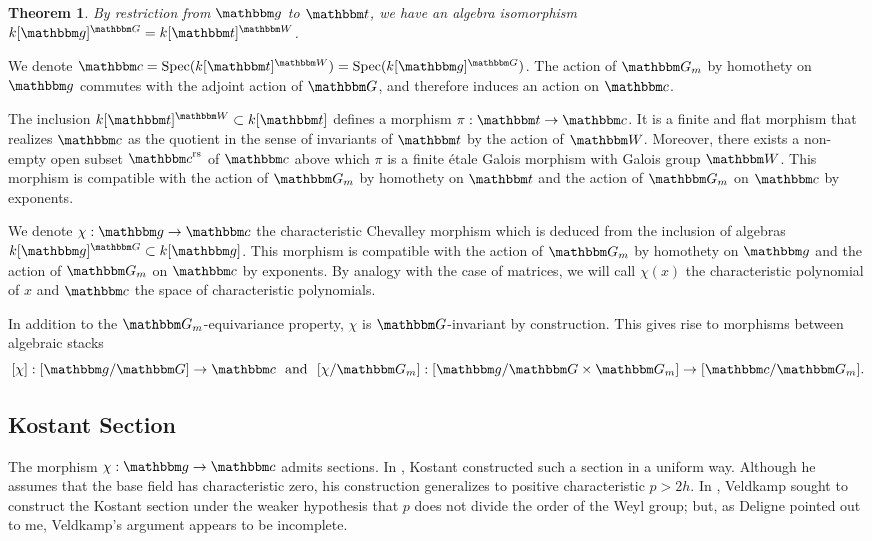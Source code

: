 \documentclass[12pt,english]{smfart}
\numberwithin{equation}{subsection}
\newtheorem{theoreme}[equation]{Theorem}
\theoremstyle{remark}
\newcommand\rta{\rightarrow}
\newcommand\GG{{\mathbbm G}}
\newcommand\bbW{{\mathbbm W}}
\newcommand\bbG{{\mathbbm G}}
\newcommand\bbg{{\mathbbm g}}
\newcommand\bbt{{\mathbbm t}}
\newcommand\bbc{{\mathbbm c}}
\newcommand\Spec{{\rm Spec}}
\newcommand\rs{{\rm rs}}
\begin{document}
\begin{theoreme}\label{Chevalley}
By restriction from $\bbg$ to $\bbt$, we have an algebra isomorphism
$k[\bbg]^\bbG =k[\bbt]^\bbW$.
\end{theoreme}


We denote $\bbc=\Spec(k[\bbt]^\bbW)=\Spec(k[\bbg]^\bbG)$. The action of $\GG_m$ by homothety on $\bbg$ commutes with the adjoint action of $\bbG$, and therefore induces an action on $\bbc$.

The inclusion $k[\bbt]^\bbW\subset k[\bbt]$ defines a morphism
$\pi:\bbt\rightarrow\bbc$. It is a finite and flat morphism that realizes
$\bbc$ as the quotient in the sense of invariants of $\bbt$ by the action of
$\bbW$. Moreover, there exists a non-empty open subset $\bbc^\rs$ of $\bbc$
above which $\pi$ is a finite \'etale Galois morphism with Galois group
$\bbW$. This morphism is compatible with the action of $\GG_m$ by
homothety on $\bbt$ and the action of $\GG_m$ on $\bbc$ by exponents.

We denote $ \chi:\bbg\rta\bbc$ the characteristic Chevalley morphism
which is deduced from the inclusion of algebras $k[\bbg]^\bbG\subset k[\bbg]$. This
morphism is compatible with the action of $\GG_m$ by homothety on
$\bbg$ and the action of $\GG_m$ on $\bbc$ by exponents. By
analogy with the case of matrices, we will call $\chi(x)$ the characteristic
polynomial of $x$ and $\bbc$ the space of characteristic
polynomials.

In addition to the $\GG_m$-equivariance property, $\chi$ is $\bbG$-invariant
by construction. This gives rise to morphisms between
algebraic stacks
$$[\chi]:[\bbg/\bbG]\rta \bbc\ \mbox{ and }\ [\chi/\GG_m]:
[\bbg/\bbG\times\GG_m]\rta [\bbc/\GG_m].$$


\subsection{Kostant Section}\label{Section de Kostant}

The morphism $\chi:\bbg\rightarrow\bbc$ admits sections. In \cite{Kos}, Kostant constructed such a section in a uniform way. Although he assumes that the base field has characteristic zero, his construction generalizes to positive characteristic $p>2h$. In \cite{Veldkamp}, Veldkamp sought to construct the Kostant section under the weaker hypothesis that $p$ does not divide the order of the Weyl group; but, as Deligne pointed out to me, Veldkamp's argument appears to be incomplete.
\end{document}
